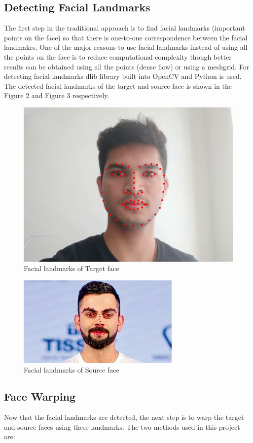 \documentclass[conference]{IEEEtran}
\begin{document}
\subsection{Detecting Facial Landmarks}
The first step in the traditional approach is to find facial landmarks (important points on the face) so that there is one-to-one correspondence between the facial landmakrs. One of the major reasons to use facial landmarks instead of using all the points on the face is to reduce computational complexity though better results can be obtained using all the points (dense flow) or using a meshgrid. For detecting facial landmarks dlib library built into OpenCV and Python is used. The detected facial landmarks of the target and source face is shown in the Figure 2 and Figure 3 respectively.
\begin{figure}[H]
\includegraphics[scale=0.2]{f_t.jpg}
\centering
\caption{Facial landmarks of Target face}
\end{figure}
\begin{figure}[H]
\includegraphics[scale=0.9]{f_s.jpg}
\centering
\caption{Facial landmarks of Source face}
\end{figure}
\subsection{Face Warping}
Now that the facial landmarks are detected, the next step is to warp the target and source faces using these landmarks. The two methods used in this project are:
\end{document}
